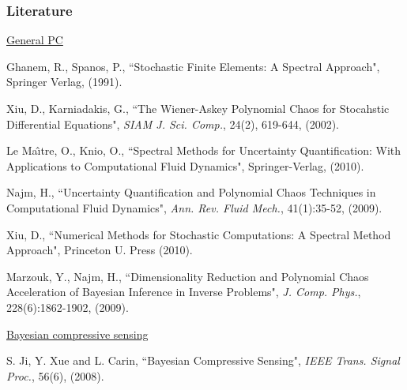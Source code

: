 \begin{frame}[t]
\label{lit}
\frametitle{Literature \hfill \hspace*{7cm}}

\vspace*{-0.3cm}

\begin{tiny}
{\parindent=0pt


 \scriptsize{\underline{General PC}}\tiny


\medskip
 Ghanem, R., Spanos, P., ``Stochastic Finite Elements: A Spectral Approach",
Springer Verlag, (1991).

\medskip
 Xiu, D., Karniadakis, G., ``The Wiener-Askey Polynomial Chaos for Stocahstic Differential
Equations", \textit{SIAM J. Sci. Comp.}, 24(2), 619-644, (2002).

\medskip
 Le Ma{\^\i}tre, O., Knio, O., ``Spectral Methods for Uncertainty Quantification:
With Applications to Computational Fluid Dynamics", Springer-Verlag, (2010).

\medskip
 Najm, H., ``Uncertainty Quantification and Polynomial Chaos Techniques in Computational
Fluid Dynamics", \textit{Ann. Rev. Fluid Mech.}, 41(1):35-52, (2009).


\medskip
 Xiu, D., ``Numerical Methods for Stochastic Computations: A Spectral Method
Approach", Princeton U. Press (2010).




\medskip
 Marzouk, Y., Najm, H., ``Dimensionality Reduction and Polynomial Chaos Acceleration of
Bayesian Inference in Inverse Problems", \textit{J. Comp. Phys.}, 228(6):1862-1902, (2009).


\bigskip
 \scriptsize{\underline{Bayesian compressive sensing}}\tiny

\medskip
S. Ji, Y. Xue and L. Carin, ``Bayesian Compressive Sensing", \textit{IEEE Trans. Signal Proc.}, 56(6), (2008).

}
\end{tiny}
\end{frame}
